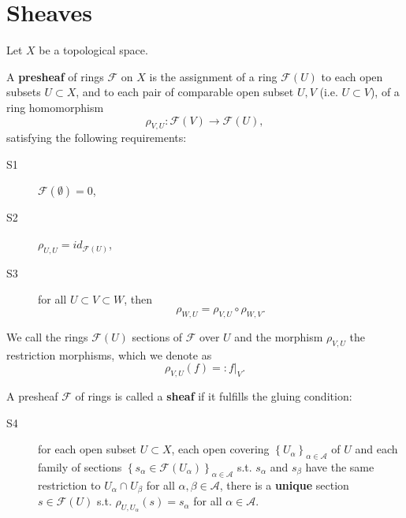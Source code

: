 \section{Sheaves}
Let $X$ be a topological space.

\begin{defn}[Presheaf]
	A \textbf{presheaf} of rings $\mathcal{F}$ on $X$ is the assignment of a ring $\mathcal{F}(U)$ to each open subsets $U \subset X$, and to each pair of comparable open subset $U,V$ (i.e. $U \subset V$), of a ring homomorphism
	\begin{equation}
		\rho_{V,U}: \mathcal{F}(V) \to \mathcal{F}(U)
	,\end{equation}
	satisfying the following requirements:
	\begin{description}
		\item[S1] $\mathcal{F}(\emptyset) = 0$,
		\item[S2] $\rho_{U,U} = id_{\mathcal{F}(U)}$,
		\item[S3] for all $U \subset V \subset W$, then
			\begin{equation}
			\rho_{W,U} = \rho_{V,U} \circ \rho_{W,V}
			.\end{equation}
	\end{description}
	We call the rings $\mathcal{F}(U)$ sections of $\mathcal{F}$ over $U$ and the morphism $\rho_{V,U}$ the restriction morphisms, which we denote as
	\begin{equation}
		\rho_{V,U}(f) =: \left.f\right|_{V} 
	.\end{equation} 
\end{defn}

\begin{defn}[Sheaf]
	A presheaf $\mathcal{F}$ of rings is called a \textbf{sheaf} if it fulfills the gluing condition:
	\begin{description}
		\item[S4] for each open subset $U \subset X$, each open covering $\left\{ U_\alpha \right\}_{\alpha \in \mathcal{A}}$ of $U$ and each family of sections $\left\{ s_\alpha \in \mathcal{F}(U_\alpha) \right\}_{\alpha \in \mathcal{A}}$ s.t. $s_\alpha$ and $s_\beta$ have the same restriction to $U_\alpha \cap_{} U_\beta$ for all $\alpha, \beta \in \mathcal{A}$, there is a \textbf{unique} section $s \in \mathcal{F}(U)$ s.t. $\rho_{U, U_\alpha}(s) = s_\alpha$ for all $\alpha \in \mathcal{A}$.
	\end{description} 
\end{defn}

